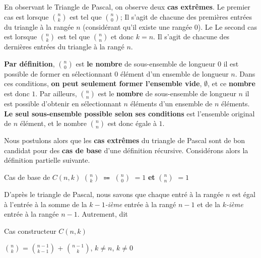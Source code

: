 \documentclass[16pt]{report}
\begin{document}
\begin{multicols*}{2}
    \begin{Concept*}{}{}
     En observant le Triangle de Pascal, on observe deux \textbf{cas extrêmes}. Le premier cas 
    est lorsque $n \choose k$ est tel que $n \choose 0$; Il s'agit de chacune des premières entrées 
    du triangle à la rangée $n$ (considérant qu'il existe une rangée 0). Le Le second cas 
    est lorsque $n \choose k$ est tel que $n \choose n$ et donc $k = n$. Il s'agit de chacune des 
    dernières entrées du triangle à la rangé $n$.        
    \end{Concept*}


    \begin{note}{}{}
        \textbf{Par définition}, 
        $n \choose 0$ est \textbf{le nombre} de sous-ensemble de longueur $0$ il est possible
        de former en sélectionnant 
        $0$ élément d'un ensemble de longueur $n$. Dans ces conditions,
        \textbf{on peut seulement former l'ensemble vide},
        $\emptyset$, et ce \textbf{nombre} est donc $1$. 
        Par ailleurs, $n \choose n$ est le \textbf{nombre} de sous-ensemble de longueur $n$ il est possible d'obtenir 
        en sélectionnant $n$ éléments d'un ensemble de $n$ éléments. \textbf{Le seul sous-ensemble 
        possible selon ses conditions} est l'ensemble original de $n$ élément, et le nombre 
        $n \choose n$ est donc égale à $1$. 
    \end{note}

    Nous postulons alors que les \textbf{cas extrêmes} du triangle de Pascal sont de bon candidat pour 
    des \textbf{cas de base} d'une définition récursive. Considérons alors la définition partielle suivante. 
    \begin{Definitionx}{Cas de base de $C(n, k)$}{}
       $n \choose k$ $\Coloneqq$ $n \choose 0$ $= 1$ \textbf{et} $n \choose n$ $= 1$      
    \end{Definitionx}

    D'après le triangle de Pascal, nous savons que chaque entré à la rangée $n$ est égal à 
    l'entrée à la somme de la $k-1$\textit{-ième} entrée à la rangé $n-1$ et de la \textit{$k$-ième} entrée 
    à la rangée $n-1$.
    Autrement, dit 
    
    \begin{Definitionx}{Cas constructeur $C(n, k)$}{}
        \begin{center}
        $n \choose k$ =  $n-1 \choose k-1$ + $n -1 \choose k$, $k \neq n$, $k \neq 0$ 
        \end{center}        
    \end{Definitionx}


\end{multicols*}
\end{document}
